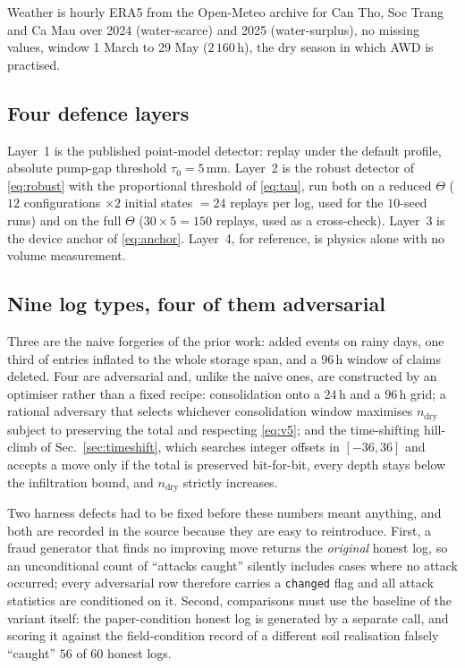 \documentclass[journal]{IEEEtran}
\begin{document}
Weather is hourly ERA5 from the Open-Meteo archive for Can Tho, Soc Trang and Ca
Mau over 2024 (water-scarce) and 2025 (water-surplus), no missing values, window
1 March to 29 May ($2\,160$\,h), the dry season in which AWD is practised.

\subsection{Four defence layers}

Layer~1 is the published point-model detector: replay under the default profile,
absolute pump-gap threshold $\tau_0=5$\,mm. Layer~2 is the robust detector of
\eqref{eq:robust} with the proportional threshold of \eqref{eq:tau}, run both on
a reduced $\Theta$ ($12$ configurations $\times2$ initial states $=24$ replays
per log, used for the $10$-seed runs) and on the full $\Theta$ ($30\times5=150$
replays, used as a cross-check). Layer~3 is the device anchor of \eqref{eq:anchor}.
Layer~4, for reference, is physics alone with no volume measurement.

\subsection{Nine log types, four of them adversarial}

Three are the naive forgeries of the prior work: added events on rainy days,
one third of entries inflated to the whole storage span, and a $96$\,h window of
claims deleted. Four are adversarial and, unlike the naive ones, are constructed
by an optimiser rather than a fixed recipe: consolidation onto a $24$\,h and a
$96$\,h grid; a rational adversary that selects whichever consolidation window
maximises $n_{\mathrm{dry}}$ subject to preserving the total and respecting
\eqref{eq:v5}; and the time-shifting hill-climb of Sec.~\ref{sec:timeshift},
which searches integer offsets in $[-36,36]$ and accepts a move only if the total
is preserved bit-for-bit, every depth stays below the infiltration bound, and
$n_{\mathrm{dry}}$ strictly increases.

Two harness defects had to be fixed before these numbers meant anything, and both
are recorded in the source because they are easy to reintroduce. First, a fraud
generator that finds no improving move returns the \emph{original} honest log, so
an unconditional count of ``attacks caught'' silently includes cases where no
attack occurred; every adversarial row therefore carries a \texttt{changed} flag
and all attack statistics are conditioned on it. Second, comparisons must use the
baseline of the variant itself: the paper-condition honest log is generated by a
separate call, and scoring it against the field-condition record of a different
soil realisation falsely ``caught'' $56$ of $60$ honest logs.
\end{document}
